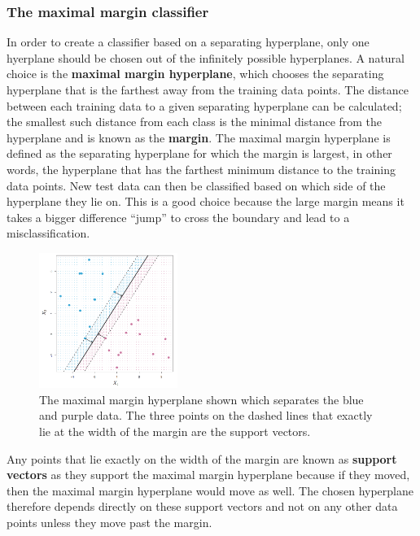 \documentclass[CS5104-Notes.tex]{subfiles}
\begin{document}
\subsubsection{The maximal margin classifier}
In order to create a classifier based on a separating hyperplane, only one hyerplane should be chosen out of the infinitely possible hyperplanes. A natural choice is the \textbf{maximal margin hyperplane}, which chooses the separating hyperplane that is the farthest away from the training data points. The distance between each training data to a given separating hyperplane can be calculated; the smallest such distance from each class is the minimal distance from the hyperplane and is known as the \textbf{margin}. The maximal margin hyperplane is defined as the separating hyperplane for which the margin is largest, in other words, the hyperplane that has the farthest minimum distance to the training data points. New test data can then be classified based on which side of the hyperplane they lie on. This is a good choice because the large margin means it takes a bigger difference ``jump'' to cross the boundary and lead to a misclassification.
\begin{figure}[H]
  \centering
  \includegraphics[width=0.4\textwidth, keepaspectratio]{imgs/maximum-margin-hyperplane.png}
  \caption{The maximal margin hyperplane shown which separates the blue and purple data. The three points on the dashed lines that exactly lie at the width of the margin are the support vectors.}
\end{figure}
\noindent
Any points that lie exactly on the width of the margin are known as \textbf{support vectors} as they support the maximal margin hyperplane because if they moved, then the maximal margin hyperplane would move as well. The chosen hyperplane therefore depends directly on these support vectors and not on any other data points unless they move past the margin.
\end{document}
